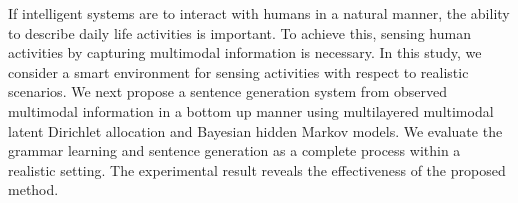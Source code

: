 If intelligent systems are to interact with humans in a natural manner, the ability to describe daily life activities is important. To achieve this, sensing human activities by capturing multimodal information is necessary. In this study, we consider a smart environment for sensing activities with respect to realistic scenarios. We next propose a sentence generation system from observed multimodal information in a bottom up manner using multilayered multimodal latent Dirichlet allocation and Bayesian hidden Markov models. We evaluate the grammar learning and sentence generation as a complete process within a realistic setting. The experimental result reveals the effectiveness of the proposed method.
